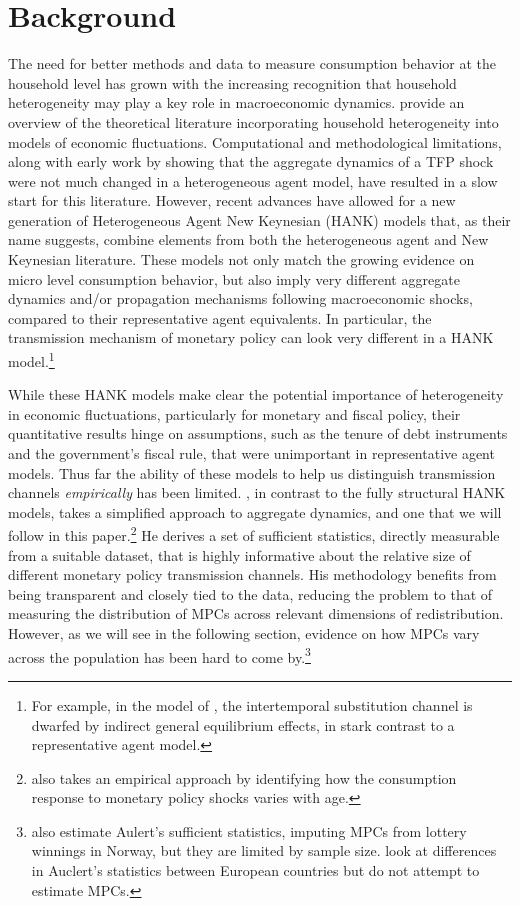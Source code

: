 \documentclass[titlepage]{\econtex}\newcommand{\texname}{ConsumptionHeterogeneity}
\begin{document}
\section{Background}
The need for better methods and data to measure consumption behavior at the household level has grown with the increasing recognition that household heterogeneity may play a key role in macroeconomic dynamics. \cite{kaplan_microeconomic_2018} provide an overview of the theoretical literature incorporating household heterogeneity into models of economic fluctuations. Computational and methodological limitations, along with early work by \cite{krusell_income_1998} showing that the aggregate dynamics of a TFP shock were not much changed in a heterogeneous agent model, have resulted in a slow start for this literature. However, recent advances have allowed for a new generation of Heterogeneous Agent New Keynesian (HANK) models that, as their name suggests, combine elements from both the heterogeneous agent and New Keynesian literature. These models not only match the growing evidence on micro level consumption behavior, but also imply very different aggregate dynamics and/or propagation mechanisms following macroeconomic shocks, compared to their representative agent equivalents. In particular, the transmission mechanism of monetary policy can look very different in a HANK model.\footnote{For example, in the model of \cite{kaplan_monetary_2016}, the intertemporal substitution channel is dwarfed by indirect general equilibrium effects, in stark contrast to a representative agent model.}

While these HANK models make clear the potential importance of heterogeneity in economic fluctuations, particularly for monetary and fiscal policy, their quantitative results hinge on assumptions, such as the tenure of debt instruments and the government's fiscal rule, that were unimportant in representative agent models. Thus far the ability of these models to help us distinguish transmission channels \textit{empirically} has been limited. \cite{auclert_monetary_2017}, in contrast to the fully structural HANK models, takes a simplified approach to aggregate dynamics, and one that we will follow in this paper.\footnote{\cite{wong_population_2016} also takes an empirical approach by identifying how the consumption response to monetary policy shocks varies with age.} He derives a set of sufficient statistics, directly measurable from a suitable dataset, that is highly informative about the  relative size of different monetary policy transmission channels. His methodology benefits from being transparent and closely tied to the data, reducing the problem to that of measuring the distribution of MPCs across relevant dimensions of redistribution. However, as we will see in the following section, evidence on how MPCs vary across the population has been hard to come by.\footnote{\cite{fagereng_mpc_2016} also estimate Aulert's sufficient statistics, imputing MPCs from lottery winnings in Norway, but they are limited by sample size. \cite{ampudia_monetary_2018} look at differences in Auclert's statistics between European countries but do not attempt to estimate MPCs.} 
\end{document}
